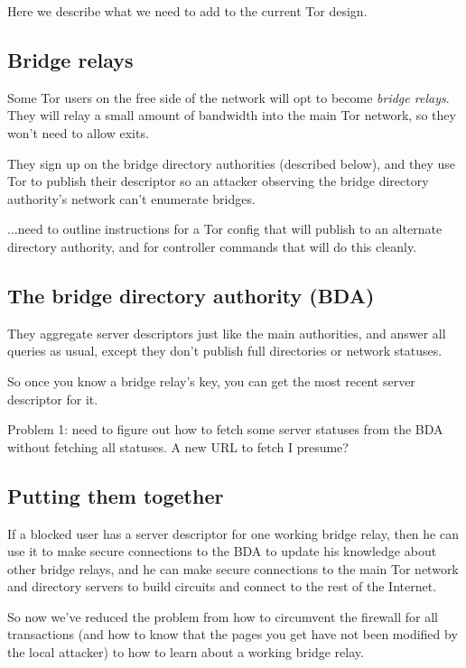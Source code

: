 \documentclass{llncs}
\begin{document}
Here we describe what we need to add to the current Tor design.

\subsection{Bridge relays}

Some Tor users on the free side of the network will opt to become
\emph{bridge relays}. They will relay a small amount of bandwidth into
the main Tor network, so they won't need to allow
exits.

They sign up on the bridge directory authorities (described below),
and they use Tor to publish their descriptor so an attacker observing
the bridge directory authority's network can't enumerate bridges.

...need to outline instructions for a Tor config that will publish
to an alternate directory authority, and for controller commands
that will do this cleanly.

\subsection{The bridge directory authority (BDA)}

They aggregate server descriptors just like the main authorities, and
answer all queries as usual, except they don't publish full directories
or network statuses.

So once you know a bridge relay's key, you can get the most recent
server descriptor for it.

Problem 1: need to figure out how to fetch some server statuses from the BDA
without fetching all statuses. A new URL to fetch I presume?

\subsection{Putting them together}

If a blocked user has a server descriptor for one working bridge relay,
then he can use it to make secure connections to the BDA to update his
knowledge about other bridge
relays, and he can make secure connections to the main Tor network
and directory servers to build circuits and connect to the rest of
the Internet.

So now we've reduced the problem from how to circumvent the firewall
for all transactions (and how to know that the pages you get have not
been modified by the local attacker) to how to learn about a working
bridge relay.
\end{document}
